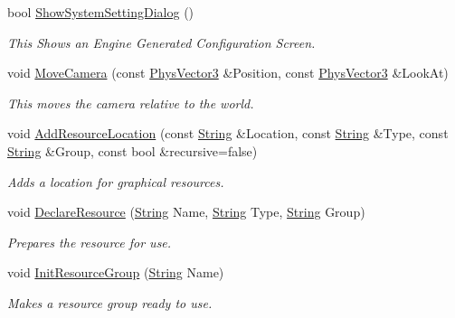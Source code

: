 \begin{DoxyCompactItemize}
bool \hyperlink{classphys_1_1World_a0d8ce136bebe81a6826b7e202a531f6a}{ShowSystemSettingDialog} ()
\begin{DoxyCompactList}\small\item\em This Shows an Engine Generated Configuration Screen. \item\end{DoxyCompactList}\item 
void \hyperlink{classphys_1_1World_ad461d55f869f8aef72d0f0e0eb1b04dd}{MoveCamera} (const \hyperlink{classPhysVector3}{PhysVector3} \&Position, const \hyperlink{classPhysVector3}{PhysVector3} \&LookAt)
\begin{DoxyCompactList}\small\item\em This moves the camera relative to the world. \item\end{DoxyCompactList}\item 
void \hyperlink{classphys_1_1World_ab26033088abe4d60a40cf770dd1b0de8}{AddResourceLocation} (const \hyperlink{namespacephys_aa03900411993de7fbfec4789bc1d392e}{String} \&Location, const \hyperlink{namespacephys_aa03900411993de7fbfec4789bc1d392e}{String} \&Type, const \hyperlink{namespacephys_aa03900411993de7fbfec4789bc1d392e}{String} \&Group, const bool \&recursive=false)
\begin{DoxyCompactList}\small\item\em Adds a location for graphical resources. \item\end{DoxyCompactList}\item 
void \hyperlink{classphys_1_1World_ad8c9834c1b9a0de437a0b29f17c0c48e}{DeclareResource} (\hyperlink{namespacephys_aa03900411993de7fbfec4789bc1d392e}{String} Name, \hyperlink{namespacephys_aa03900411993de7fbfec4789bc1d392e}{String} Type, \hyperlink{namespacephys_aa03900411993de7fbfec4789bc1d392e}{String} Group)
\begin{DoxyCompactList}\small\item\em Prepares the resource for use. \item\end{DoxyCompactList}\item 
void \hyperlink{classphys_1_1World_a82b1b40f39c1f2e48759fdb77389153d}{InitResourceGroup} (\hyperlink{namespacephys_aa03900411993de7fbfec4789bc1d392e}{String} Name)
\begin{DoxyCompactList}\small\item\em Makes a resource group ready to use. \item\end{DoxyCompactList}\item 

\end{DoxyCompactItemize}

